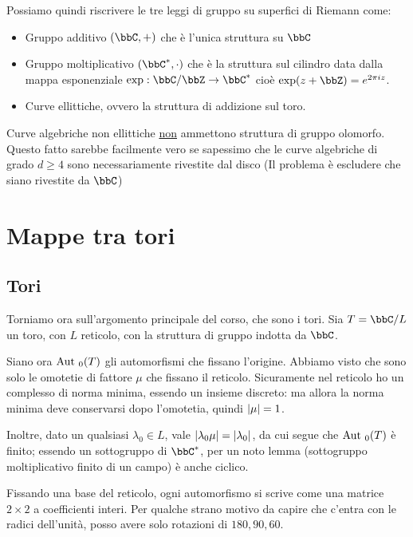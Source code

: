 Possiamo quindi riscrivere le tre leggi di gruppo su superfici di Riemann come:
\begin{itemize}
    \item Gruppo additivo $(\bbC,+)$ che è l'unica struttura su $\bbC$
    \item Gruppo moltiplicativo $(\bbC^\ast,\cdot)$ che è la struttura sul cilindro data dalla mappa esponenziale $\exp: \bbC / \bbZ \to \bbC^\ast$ cioè $\exp(z+\bbZ)=e^{2\pi i z}$.
    \item Curve ellittiche, ovvero la struttura di addizione sul toro.
\end{itemize}

\begin{corollario}
  Curve algebriche non ellittiche \underline{non} ammettono struttura di gruppo olomorfo.
  Questo fatto sarebbe facilmente vero se sapessimo che le curve algebriche di grado $d \ge 4$ sono necessariamente rivestite dal disco (Il problema è escludere che siano rivestite da $\bbC$)
\end{corollario}


\chapter{Mappe tra tori}

	\section{Tori}

	Torniamo ora sull'argomento principale del corso, che sono i tori. Sia $T = \bbC / L$ un toro, con $L$ reticolo, con la struttura di gruppo indotta da $\bbC$.

	Siano ora $\text{Aut }_0(T)$ gli automorfismi che fissano l'origine. Abbiamo visto che sono solo le omotetie di fattore $\mu$ che fissano il reticolo. Sicuramente nel reticolo ho un complesso di norma minima, essendo un insieme discreto: ma allora la norma minima deve conservarsi dopo l'omotetia, quindi $\left| \mu \right|=1$.

	Inoltre, dato un qualsiasi $\lambda_0 \in L$, vale $\left| \lambda_0 \mu \right| = \left| \lambda_0 \right|$, da cui segue che $\text{Aut }_0(T)$ è finito; essendo un sottogruppo di $\bbC^*$, per un noto lemma (sottogruppo moltiplicativo finito di un campo) è anche ciclico.

	Fissando una base del reticolo, ogni automorfismo si scrive come una matrice $2 \times 2$ a coefficienti interi. Per qualche strano motivo da capire che c'entra con le radici dell'unità, %
	posso avere solo rotazioni di $180, 90, 60$.

